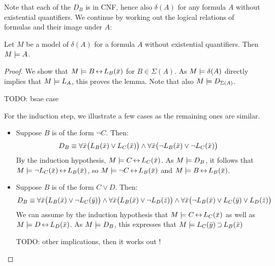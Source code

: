 Note that each of the $D_B$ is in CNF, hence also $\delta(A)$ for any formula $A$ without existential quantifiers.
We continue by working out the logical relations of formulas and their image under $A$:

\begin{lemma}
	Let $M$ be a model of $\delta(A)$ for a formula $A$ without existential quantifiers.
	Then $M \models A$.
\end{lemma}
\begin{proof}

	We show that $M \models B \operatorname{\leftrightarrow} L_B(\bar x)$ for $B \in \Sigma(A)$.
	As $M\models \delta(A)$ directly implies that $M\models L_A$, this proves the lemma.
	Note that also $M \models D_{\Sigma(A)}$.

	TODO: bsae  case 

	For the induction step, we illustrate a few cases as the remaining ones are similar.
	\begin{itemize}
		\item Suppose $B$ is of the form $\lnot C$.
			Then:
			\[D_B \equiv \forall \bar x \big(L_B(\bar x) \lor L_C(\bar x)\big) \land\linebreak[0] \forall \bar x \big(\lnot L_B(\bar x) \lor \lnot L_C(\bar x)\big)\]
			By the induction hypothesis, $M \models C \operatorname{\leftrightarrow} L_C(\bar x)$.
			As $M \models D_B$, it follows that $M\models \lnot L_C(\bar x) \operatorname{\leftrightarrow} L_B(\bar x)$,
			so $M\models \lnot C \operatorname{\leftrightarrow} L_B(\bar x)$
			and $M\models B \operatorname{\leftrightarrow} L_B(\bar x)$.

		\item Suppose $B$ is of the form $C \lor D$.
			Then:
			\[D_B\equiv \forall \bar x \big(L_B(\bar x) \lor \lnot L_C(\bar y)\big) \land\linebreak[0] \forall \bar x \big(L_B(\bar x) \lor \lnot L_D(\bar z)\big) \land\linebreak[0] \forall \bar x \big(\lnot L_B(\bar x) \lor L_C(\bar y) \lor L_D(\bar z)\big)\]
			We can assume by the induction hypothesis that 
			$M \models C \operatorname{\leftrightarrow} L_C(\bar x)$ as well as 
			$M \models D \operatorname{\leftrightarrow} L_D(\bar x)$.
			As $M \models D_B$, this expresses that
			$M\models L_C(\bar y) \operatorname{\supset} L_B(\bar x)$

			TODO: other implications, then it works out !



	\end{itemize}


\end{proof}

